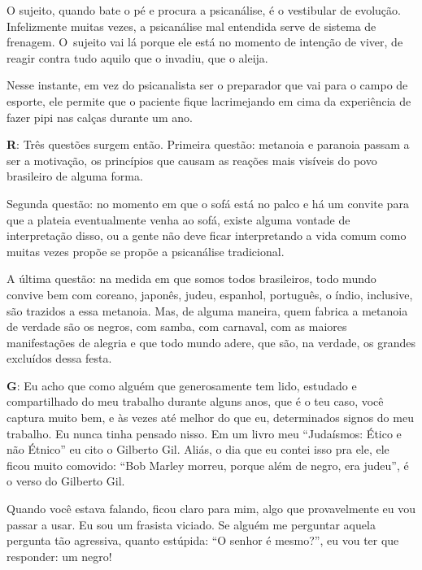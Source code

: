  

O sujeito, quando bate o pé e procura a psicanálise, é o vestibular de
evolução. Infelizmente muitas vezes, a psicanálise mal entendida serve
de sistema de frenagem. O~sujeito vai lá porque ele está no momento de
intenção de viver, de reagir contra tudo aquilo que o invadiu, que o
aleija.

 

Nesse instante, em vez do psicanalista ser o preparador que vai para o
campo de esporte, ele permite que o paciente fique lacrimejando em cima
da experiência de fazer pipi nas calças durante um ano.

 

\textbf{R}: Três questões surgem então. Primeira questão: metanoia e
paranoia passam a ser a motivação, os princípios que causam as reações
mais visíveis do povo brasileiro de alguma forma.

Segunda questão: no momento em que o sofá está no palco e há um convite
para que a plateia eventualmente venha ao sofá, existe alguma vontade de
interpretação disso, ou a gente não deve ficar interpretando a vida
comum como muitas vezes propõe se propõe a psicanálise tradicional.

A última questão: na medida em que somos todos brasileiros, todo mundo
convive bem com coreano, japonês, judeu, espanhol, português, o índio,
inclusive, são trazidos a essa metanoia. Mas, de alguma maneira, quem
fabrica a metanoia de verdade são os negros, com samba, com carnaval,
com as maiores manifestações de alegria e que todo mundo adere, que são,
na verdade, os grandes excluídos dessa festa.

 

\textbf{G}: Eu acho que como alguém que generosamente tem lido,
estudado e compartilhado do meu trabalho durante alguns anos, que é o
teu caso, você captura muito bem, e às vezes até melhor do que eu,
determinados signos do meu trabalho. Eu nunca tinha pensado nisso. Em um
livro meu ``Judaísmos: Ético e não Étnico'' eu cito o Gilberto Gil.
Aliás, o dia que eu contei isso pra ele, ele ficou muito comovido: ``Bob
Marley morreu, porque além de negro, era judeu'', é o verso do Gilberto
Gil.

 

Quando você estava falando, ficou claro para mim, algo que provavelmente
eu vou passar a usar. Eu sou um frasista viciado. Se alguém me perguntar
aquela pergunta tão agressiva, quanto estúpida: ``O senhor é mesmo?'',
eu vou ter que responder: um negro!

